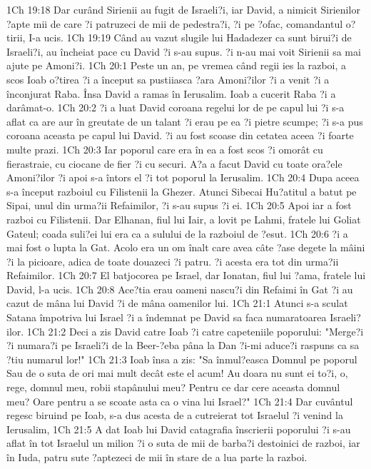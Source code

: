 1Ch 19:18  Dar curând Sirienii au fugit de Israeli?i, iar David, a nimicit Sirienilor ?apte mii de care ?i patruzeci de mii de pedestra?i, ?i pe ?ofac, comandantul o?tirii, I-a ucis.
1Ch 19:19  Când au vazut slugile lui Hadadezer ca sunt birui?i de Israeli?i, au încheiat pace cu David ?i s-au supus. ?i n-au mai voit Sirienii sa mai ajute pe Amoni?i.
1Ch 20:1  Peste un an, pe vremea când regii ies la razboi, a scos Ioab o?tirea ?i a început sa pustiiasca ?ara Amoni?ilor ?i a venit ?i a înconjurat Raba. Însa David a ramas în Ierusalim. Ioab a cucerit Raba ?i a darâmat-o.
1Ch 20:2  ?i a luat David coroana regelui lor de pe capul lui ?i s-a aflat ca are aur în greutate de un talant ?i erau pe ea ?i pietre scumpe; ?i s-a pus coroana aceasta pe capul lui David. ?i au fost scoase din cetatea aceea ?i foarte multe prazi.
1Ch 20:3  Iar poporul care era în ea a fost scos ?i omorât cu fierastraie, cu ciocane de fier ?i cu securi. A?a a facut David cu toate ora?ele Amoni?ilor ?i apoi s-a întors el ?i tot poporul la Ierusalim.
1Ch 20:4  Dupa aceea s-a început razboiul cu Filistenii la Ghezer. Atunci Sibecai Hu?atitul a batut pe Sipai, unul din urma?ii Refaimilor, ?i s-au supus ?i ei.
1Ch 20:5  Apoi iar a fost razboi cu Filistenii. Dar Elhanan, fiul lui Iair, a lovit pe Lahmi, fratele lui Goliat Gateul; coada suli?ei lui era ca a sulului de la razboiul de ?esut.
1Ch 20:6  ?i a mai fost o lupta la Gat. Acolo era un om înalt care avea câte ?ase degete la mâini ?i la picioare, adica de toate douazeci ?i patru. ?i acesta era tot din urma?ii Refaimilor.
1Ch 20:7  El batjocorea pe Israel, dar Ionatan, fiul lui ?ama, fratele lui David, l-a ucis.
1Ch 20:8  Ace?tia erau oameni nascu?i din Refaimi în Gat ?i au cazut de mâna lui David ?i de mâna oamenilor lui.
1Ch 21:1  Atunci s-a sculat Satana împotriva lui Israel ?i a îndemnat pe David sa faca numaratoarea Israeli?ilor.
1Ch 21:2  Deci a zis David catre Ioab ?i catre capeteniile poporului: "Merge?i ?i numara?i pe Israeli?i de la Beer-?eba pâna la Dan ?i-mi aduce?i raspuns ca sa ?tiu numarul lor!"
1Ch 21:3  Ioab însa a zis: "Sa înmul?easca Domnul pe poporul Sau de o suta de ori mai mult decât este el acum! Au doara nu sunt ei to?i, o, rege, domnul meu, robii stapânului meu? Pentru ce dar cere aceasta domnul meu? Oare pentru a se scoate asta ca o vina lui Israel?"
1Ch 21:4  Dar cuvântul regesc biruind pe Ioab, s-a dus acesta de a cutreierat tot Israelul ?i venind la Ierusalim,
1Ch 21:5  A dat Ioab lui David catagrafia înscrierii poporului ?i s-au aflat în tot Israelul un milion ?i o suta de mii de barba?i destoinici de razboi, iar în Iuda, patru sute ?aptezeci de mii în stare de a lua parte la razboi.
